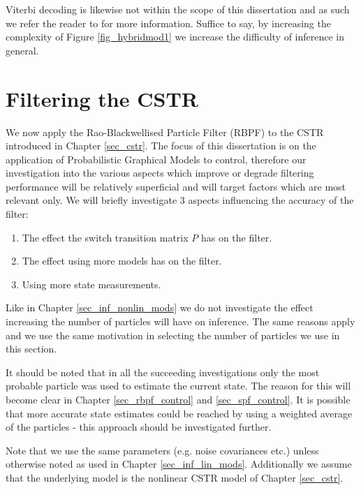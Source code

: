 Viterbi decoding is likewise not within the scope of this dissertation and as such we refer the reader to \cite{murphy1} for more information. Suffice to say, by increasing the complexity of Figure \ref{fig_hybridmod1} we increase the difficulty of inference in general.

\section{Filtering the CSTR}
\label{sec_rbpf_filtering_cstr}
We now apply the Rao-Blackwellised Particle Filter (RBPF) to the CSTR introduced in Chapter \ref{sec_cstr}. The focus of this dissertation is on the application of Probabilistic Graphical Models to control, therefore our investigation into the various aspects which improve or degrade filtering performance will be relatively superficial and will target factors which are most relevant only. We will briefly investigate 3 aspects influencing the accuracy of the filter:
\begin{enumerate}
\item
The effect the switch transition matrix $P$ has on the filter.
\item
The effect using more models has on the filter.
\item
Using more state measurements.
\end{enumerate}
Like in Chapter \ref{sec_inf_nonlin_mods} we do not investigate the effect increasing the number of particles will have on inference. The same reasons apply and we use the same motivation in selecting the number of particles we use in this section.

It should be noted that in all the succeeding investigations only the most probable particle was used to estimate the current state. The reason for this will become clear in Chapter \ref{sec_rbpf_control} and \ref{sec_spf_control}. It is possible that more accurate state estimates could be reached by using a weighted average of the particles - this approach should be investigated further.

Note that we use the same parameters (e.g. noise covariances etc.) unless otherwise noted as used in Chapter \ref{sec_inf_lin_mods}. Additionally we assume that the underlying model is the nonlinear CSTR model of Chapter \ref{sec_cstr}.

